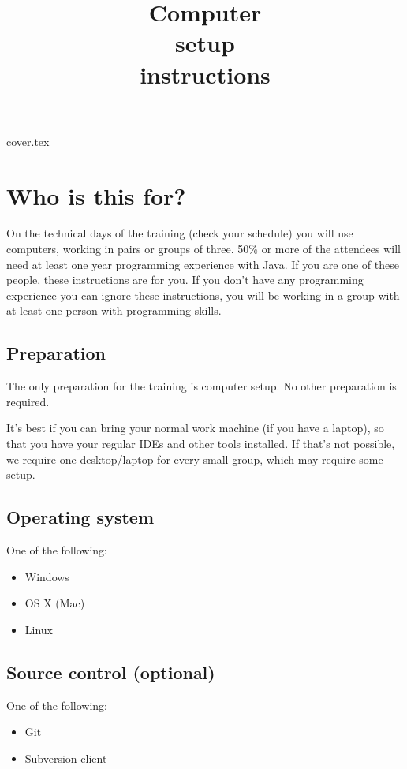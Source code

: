 \documentclass[a4paper,12pt]{report}
\title{Computer\\setup\\instructions}
\newcommand{\workbookLanguage}{Java}
\begin{document}
{cover.tex}

\chapter*{Who is this for?}

On the technical days of the training (check your schedule) you will use computers, working in pairs or groups of three. 
50\% or more of the attendees will need at least one year programming experience with \workbookLanguage{}. If you are one of these people,
these instructions are for you. If you don't have any programming experience you can ignore these instructions, you will be working in a group
with at least one person with programming skills.

\section*{Preparation}

The only preparation for the training is computer setup. No other preparation is required.

It's best if you can bring your normal work machine (if you have a laptop), so that you have your regular IDEs and other tools installed.
If that's not possible, we require one desktop/laptop for every small group, which may require some setup.

\section*{Operating system}

One of the following:

\begin{itemize}
    \item Windows
    \item OS X (Mac)
    \item Linux
\end{itemize}

\section*{Source control (optional)}

One of the following:

\begin{itemize}
    \item Git
    \item Subversion client
\end{itemize}
\end{document}
